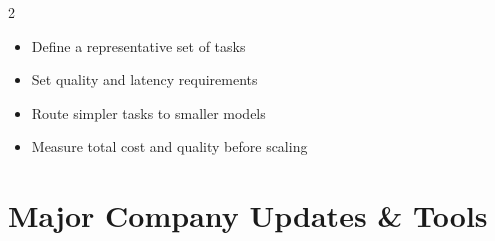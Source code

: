 \documentclass[10pt, a4paper]{article}
\begin{document}
\begin{multicols}{2}
\begin{insightbox}[title={\faServer\quad Strategic Routing Pattern}]
  \begin{itemize}[label=\textbullet, itemsep=2pt, leftmargin=*]
    \item {\small Define a representative set of tasks}
    \item {\small Set quality and latency requirements}
    \item {\small Route simpler tasks to smaller models}
    \item {\small Measure total cost and quality before scaling}
  \end{itemize}
\end{insightbox}

\end{multicols}

\clearpage

\section{Major Company Updates \& Tools}
\end{document}

